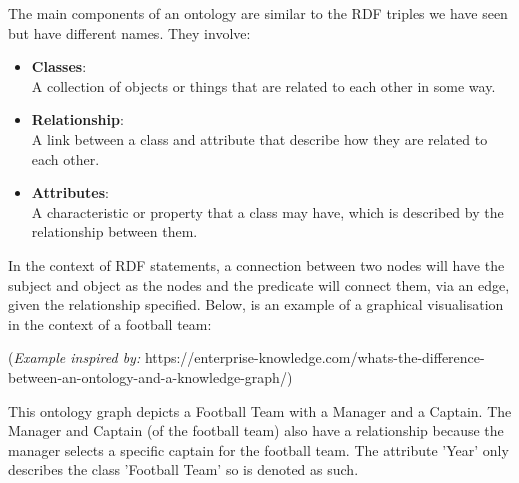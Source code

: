 The main components of an ontology are similar to the RDF triples we have seen but have different names. They involve:
\begin{itemize}
\item \textbf{Classes}: \\
A collection of objects or things that are related to each other in some way. \cite{ontologymeaning}

\item \textbf{Relationship}: \\
A link between a class and attribute that describe how they are related to each other. \cite{ontologymeaning}

\item \textbf{Attributes}:\\ 
A characteristic or property that a class may have, which is described by the relationship between them. \cite{ontologymeaning}

\end{itemize}

In the context of RDF statements, a connection between two nodes will have the subject and object as the nodes and the predicate will connect them, via an edge, given the relationship specified. Below, is an example of a graphical visualisation in the context of a football team:

 \bigskip
\begin{center}
\end{center}
(\textit{Example inspired by:} https://enterprise-knowledge.com/whats-the-difference-between-an-ontology-and-a-knowledge-graph/)

This ontology graph depicts a Football Team with a Manager and a Captain. The Manager and Captain (of the football team) also have a relationship because the manager selects a specific captain for the football team. The attribute 'Year' only describes the class 'Football Team' so is denoted as such.

